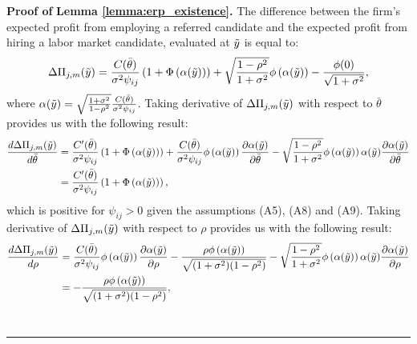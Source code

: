 \documentclass[12pt]{article}
\newenvironment{proof}[1][Proof of]{\noindent\textbf{#1} }{\ \rule{0.5em}{0.5em}}
\begin{document}
\begin{proof}
    \textbf{Lemma \ref{lemma:erp_existence}.}
    The difference between the firm's expected profit from employing a referred candidate and the expected profit from hiring a labor market candidate, evaluated at $\Tilde{y}$ is equal to:
    \begin{equation}
        \Delta\Pi_{j,m}(\Tilde{y})
    = \frac{C(\bar{\theta})}{\sigma^2\psi_{ij}}\left(1+\Phi\left(\alpha(\Tilde{y})\right)\right)
    + \sqrt{\frac{1-\rho^2}{1+\sigma^2}}\phi\left(\alpha(\Tilde{y})\right) - \frac{\phi(0)}{\sqrt{1+\sigma^2}},
    \end{equation}
    where $\alpha(\Tilde{y}) = \sqrt{\frac{1+\sigma^2}{1-\rho^2}}\frac{C(\bar{\theta})}{\sigma^2 \psi_{ij}}$. Taking derivative of $\Delta\Pi_{j,m}(\Tilde{y})$ with respect to $\bar{\theta}$ provides us with the following result:
    \begin{equation*}
        \begin{aligned}
            \frac{d\Delta\Pi_{j,m}(\Tilde{y})}{d\bar{\theta}} & 
            = \frac{C'(\bar{\theta})}{\sigma^2 \psi_{ij}} \left(1+\Phi\left(\alpha(\Tilde{y})\right)\right)
            + \frac{C(\bar{\theta})}{\sigma^2 \psi_{ij}}\phi\left(\alpha(\Tilde{y})\right)\frac{\partial \alpha(\Tilde{y})}{\partial \bar{\theta}}
            - \sqrt{\frac{1-\rho^2}{1+\sigma^2}}\phi\left(\alpha(\Tilde{y})\right)\alpha(\Tilde{y})\frac{\partial \alpha(\Tilde{y})}{\partial \bar{\theta}}\\
            & = \frac{C'(\bar{\theta})}{\sigma^2 \psi_{ij}} \left(1+\Phi\left(\alpha(\Tilde{y})\right)\right),
        \end{aligned}
    \end{equation*}
    which is positive for $\psi_{ij} >0$ given the assumptions (A5), (A8) and (A9). Taking derivative of $\Delta\Pi_{j,m}(\Tilde{y})$ with respect to $\rho$ provides us with the following result:
    \begin{equation*}
        \begin{aligned}
            \frac{d\Delta\Pi_{j,m}(\Tilde{y})}{d\rho} & 
            = \frac{C(\bar{\theta})}{\sigma^2 \psi_{ij}} \phi\left(\alpha(\Tilde{y})\right) \frac{\partial \alpha(\Tilde{y})}{\partial \rho}
            -\frac{\rho \phi\left(\alpha(\Tilde{y})\right)}{\sqrt{(1+\sigma^2)(1-\rho^2)}}
            - \sqrt{\frac{1-\rho^2}{1+\sigma^2}} \phi\left(\alpha(\Tilde{y})\right) \alpha(\Tilde{y}) \frac{\partial \alpha(\Tilde{y})}{\partial \rho}\\
            & = -\frac{\rho \phi\left(\alpha(\Tilde{y})\right)}{\sqrt{(1+\sigma^2)(1-\rho^2)}},

\end{aligned}
\end{equation*}
\end{proof}
\end{document}
